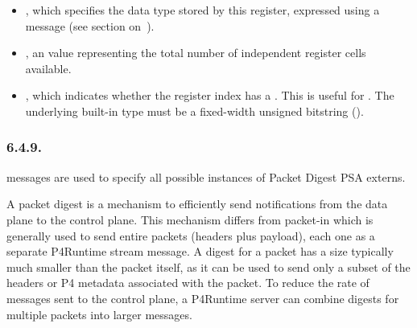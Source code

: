 \documentclass[11pt]{article}
\begin{document}
{\begin{itemize}
\item{}
, which specifies the data type stored by this register, expressed
using a  message (see section on~).%

\item{}
, an  value representing the total number of independent register
cells available.%

\item{}
, which indicates whether the register index has a
. This is useful for
. The underlying built-in type
must be a fixed-width unsigned bitstring ().%
\end{itemize}%

\subsubsection{6.4.9.\hspace*{0.5em}}\label{sec-digest}%

\noindent{} messages are used to specify all possible instances of Packet Digest
PSA externs.%

A packet digest is a mechanism to efficiently send notifications from the data
plane to the control plane. This mechanism differs from packet-in which is
generally used to send entire packets (headers plus payload), each one as a
separate P4Runtime stream message. A digest for a packet has a size typically
much smaller than the packet itself, as it can be used to send only a subset of
the headers or P4 metadata associated with the packet. To reduce the rate of
messages sent to the control plane, a P4Runtime server can combine digests for
multiple packets into larger messages.%

}
\end{document}
